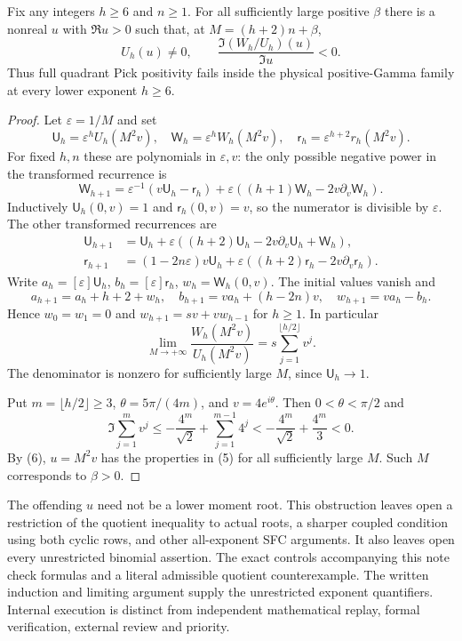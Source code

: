 \documentclass[11pt]{article}
\begin{document}
\begin{proposition}\label{prop:quadrant-obstruction}
Fix any integers $h\ge6$ and $n\ge1$.  For all sufficiently large
positive $\beta$ there is a nonreal $u$ with $\Re u>0$ such that,
at $M=(h+2)n+\beta$,
\[
U_h(u)\ne0,\qquad
\frac{\Im(W_h/U_h)(u)}{\Im u}<0.                     \tag{5}
\]
Thus full quadrant Pick positivity fails inside the physical
positive-Gamma family at every lower exponent $h\ge6$.
\end{proposition}
\begin{proof}
Let $\varepsilon=1/M$ and set
\[
\mathsf U_h=\varepsilon^hU_h(M^2v),\quad
\mathsf W_h=\varepsilon^hW_h(M^2v),\quad
\mathsf r_h=\varepsilon^{h+2}r_h(M^2v).
\]
For fixed $h,n$ these are polynomials in $\varepsilon,v$:
the only possible negative power in the transformed recurrence is
\[
\mathsf W_{h+1}
 =\varepsilon^{-1}(v\mathsf U_h-\mathsf r_h)
   +\varepsilon((h+1)\mathsf W_h-2v\partial_v\mathsf W_h).
\]
Inductively $\mathsf U_h(0,v)=1$ and $\mathsf r_h(0,v)=v$, so
the numerator is divisible by $\varepsilon$.
The other transformed recurrences are
\[
\begin{split}
\mathsf U_{h+1}
 &=\mathsf U_h+\varepsilon((h+2)\mathsf U_h
                -2v\partial_v\mathsf U_h+\mathsf W_h),\\
\mathsf r_{h+1}
 &=(1-2n\varepsilon)v\mathsf U_h+
        \varepsilon((h+2)\mathsf r_h-2v\partial_v\mathsf r_h).
\end{split}
\]
Write $a_h=[\varepsilon]\mathsf U_h$,
$b_h=[\varepsilon]\mathsf r_h$,
$w_h=\mathsf W_h(0,v)$.  The initial values vanish and
\[
a_{h+1}=a_h+h+2+w_h,\quad
b_{h+1}=va_h+(h-2n)v,\quad w_{h+1}=va_h-b_h.
\]
Hence $w_0=w_1=0$ and
$w_{h+1}=sv+vw_{h-1}$ for $h\ge1$.  In particular
\[
\lim_{M\to+\infty}\frac{W_h(M^2v)}{U_h(M^2v)}
 =s\sum_{j=1}^{\lfloor h/2\rfloor}v^j.              \tag{6}
\]
The denominator is nonzero for sufficiently large $M$, since
$\mathsf U_h\to1$.

Put $m=\lfloor h/2\rfloor\ge3$, $\theta=5\pi/(4m)$, and
$v=4e^{i\theta}$.  Then $0<\theta<\pi/2$ and
\[
\Im\sum_{j=1}^mv^j
 \le-\frac{4^m}{\sqrt2}+\sum_{j=1}^{m-1}4^j
 <-\frac{4^m}{\sqrt2}+\frac{4^m}{3}<0.
\]
By (6), $u=M^2v$ has the properties in (5) for all sufficiently
large $M$.  Such $M$ corresponds to $\beta>0$.
\end{proof}

The offending $u$ need not be a lower moment root.  This obstruction
leaves open a restriction of the quotient inequality to actual roots,
a sharper coupled condition using both cyclic rows, and other
all-exponent SFC arguments.  It also leaves open every unrestricted
binomial assertion. The exact controls accompanying this note check formulas
and a literal admissible quotient counterexample. The written induction
and limiting argument supply the unrestricted exponent quantifiers.
Internal execution is distinct from independent mathematical replay,
formal verification, external review and priority.
\end{document}
